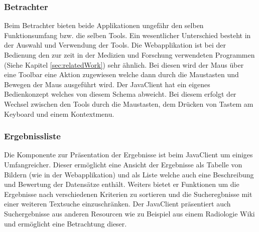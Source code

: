 \subsubsection{Betrachter}
\label{sec:ua_Betrachter}
Beim Betrachter bieten beide Applikationen ungefähr den selben Funktionsumfang bzw. die selben Tools.
Ein wesentlicher Unterschied besteht in der Auswahl und Verwendung der Tools.
Die Webapplikation ist bei der Bedienung den zur zeit in der Medizien und Forschung verwendeten Programmen (Siehe Kapitel \ref{sec:relatedWork}) sehr ähnlich.
Bei diesen wird der Maus über eine Toolbar eine Aktion zugewiesen welche dann durch die Maustasten und Bewegen der Maus ausgeführt wird.
Der JavaClient hat ein eigenes Bedienkonzept welches von diesem Schema abweicht.
Bei diesem erfolgt der Wechsel zwischen den Tools durch die Maustasten, dem Drücken von Tastem am Keyboard und einem Kontextmenu.

\subsubsection{Ergebnissliste}
\label{sec:ua_Ergebnissliste}
Die Komponente zur Präsentation der Ergebnisse ist beim JavaClient um einiges Umfangreicher.
Dieser ermöglicht eine Ansicht der Ergebnisse als Tabelle von Bildern (wie in der Webapplikation) und als Liste welche auch eine Beschreibung und Bewertung der Datensätze enthält.
Weiters bietet er Funktionen um die Ergebnisse nach verschiedenen Kriterien zu sortieren und die Sucheregbnisse mit einer weiteren Textsuche einzuschränken.
Der JavaClient präsentiert auch Suchergebnisse aus anderen Resourcen wie zu Beispiel aus einem Radiologie Wiki und ermöglicht eine Betrachtung dieser.
